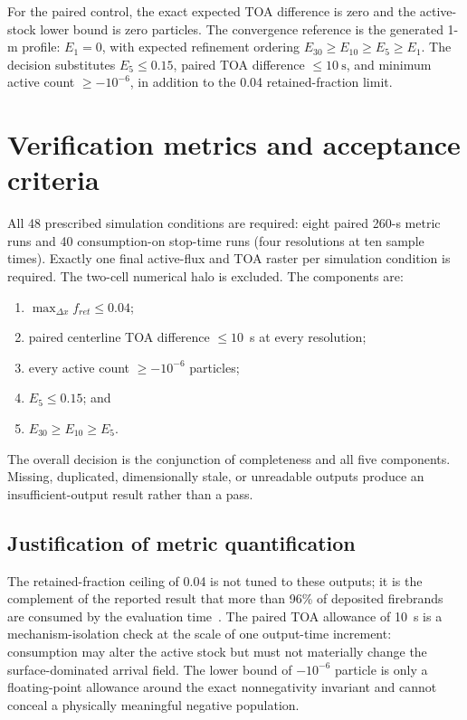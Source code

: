 For the paired control, the exact expected TOA difference is zero and the
active-stock lower bound is zero particles.  The convergence reference is the
generated 1-m profile:
\(E_1=0\), with expected refinement ordering
\(E_{30}\geq E_{10}\geq E_5\geq E_1\).
The decision substitutes \(E_5\leq0.15\), paired TOA difference
\(\leq10~\mathrm{s}\), and minimum active count
\(\geq-10^{-6}\), in addition to the 0.04 retained-fraction limit.

\section{Verification metrics and acceptance criteria}
All 48 prescribed simulation conditions are required: eight paired 260-s metric runs and 40
consumption-on stop-time runs (four resolutions at ten sample times). Exactly
one final active-flux and TOA raster per simulation condition is required. The two-cell numerical halo is excluded. The components
are:
\begin{enumerate}
 \item \(\max_{\Delta x} f_{ret}\le0.04\);
 \item paired centerline TOA difference \(\le10\)~s at every resolution;
 \item every active count \(\ge-10^{-6}\) particles;
 \item \(E_5\le0.15\); and
 \item \(E_{30}\ge E_{10}\ge E_5\).
\end{enumerate}
The overall decision is the conjunction of completeness and all five
components. Missing, duplicated, dimensionally stale, or unreadable outputs
produce an insufficient-output result rather than a pass.

\subsection{Justification of metric quantification}

The retained-fraction ceiling of 0.04 is not tuned to these outputs; it is the
complement of the reported result that more than 96\% of deposited firebrands
are consumed by the evaluation time~\cite{Qin2025}.  The paired TOA allowance
of \SI{10}{s} is a mechanism-isolation check at the scale of one output-time
increment: consumption may alter the active stock but must not materially
change the surface-dominated arrival field.  The lower bound of
\(-10^{-6}\) particle is only a floating-point allowance around the exact
nonnegativity invariant and cannot conceal a physically meaningful negative
population.

